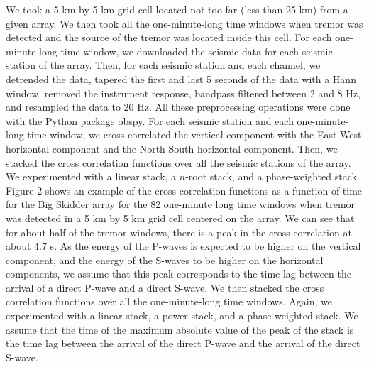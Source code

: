 \documentclass[draft]{agujournal2019}
\begin{document}
We took a 5 km by 5 km grid cell located not too far (less than 25 km) from a given array. We then took all the one-minute-long time windows when tremor was detected and the source of the tremor was located inside this cell. For each one-minute-long time window, we downloaded the seismic data for each seismic station of the array. Then, for each seismic station and each channel, we detrended the data, tapered the first and last 5 seconds of the data with a Hann window, removed the instrument response, bandpass filtered between 2 and 8 Hz, and resampled the data to 20 Hz. All these preprocessing operations were done with the Python package obspy. For each seismic station and each one-minute-long time window, we cross correlated the vertical component with the East-West horizontal component and the North-South horizontal component. Then, we stacked the cross correlation functions over all the seismic stations of the array. We experimented with a linear stack, a $n$-root stack, and a phase-weighted stack. Figure 2 shows an example of the cross correlation functions as a function of time for the Big Skidder array for the 82 one-minute long time windows when tremor was detected in a 5 km by 5 km grid cell centered on the array. We can see that for about half of the tremor windows, there is a peak in the cross correlation at about 4.7 s. As the energy of the P-waves is expected to be higher on the vertical component, and the energy of the S-waves to be higher on the horizontal components, we assume that this peak corresponds to the time lag between the arrival of a direct P-wave and a direct S-wave. We then stacked the cross correlation functions over all the one-minute-long time windows. Again, we experimented with a linear stack, a power stack, and a phase-weighted stack. We assume that the time of the maximum absolute value of the peak of the stack is the time lag between the arrival of the direct P-wave and the arrival of the direct S-wave. 
\end{document}
